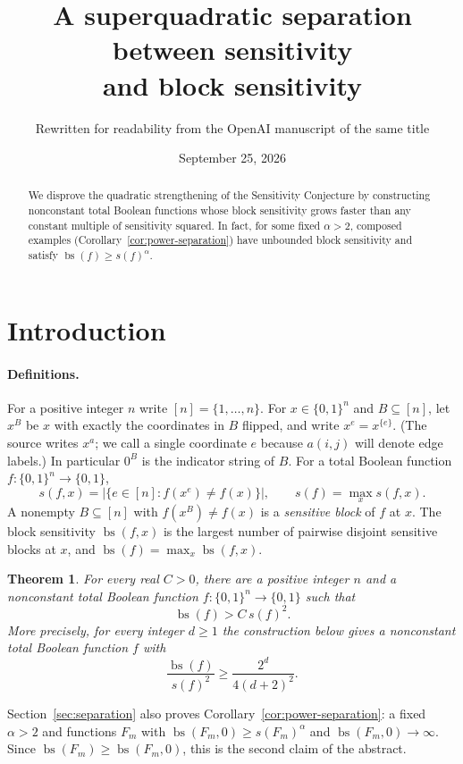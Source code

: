 \documentclass[11pt]{article}
\title{A superquadratic separation between sensitivity\\and block sensitivity}
\author{Rewritten for readability from the OpenAI manuscript of the same title}
\date{September 25, 2026}
\newcommand{\bs}{\operatorname{bs}}
\newtheorem{theorem}{Theorem}[section]
\theoremstyle{definition}
\theoremstyle{remark}
\begin{document}
\maketitle
\begin{abstract}
We disprove the quadratic strengthening of the Sensitivity Conjecture by
constructing nonconstant total Boolean functions whose block sensitivity grows
faster than any constant multiple of sensitivity squared. In fact, for some
fixed \(\alpha>2\), composed examples (Corollary~\ref{cor:power-separation})
have unbounded block sensitivity and satisfy \(\bs(f)\ge s(f)^\alpha\).
\end{abstract}

\section{Introduction}
\label{sec:introduction}

\paragraph{Definitions.}
For a positive integer $n$ write $[n]=\{1,\ldots,n\}$. For $x\in\{0,1\}^n$ and
$B\subseteq[n]$, let $x^B$ be $x$ with exactly the coordinates in $B$ flipped,
and write $x^e=x^{\{e\}}$. (The source writes $x^a$; we call a single
coordinate $e$ because $a(i,j)$ will denote edge labels.) In particular $0^B$
is the indicator string of $B$. For a total Boolean function
$f:\{0,1\}^n\to\{0,1\}$,
\[
 s(f,x)=\bigl|\{e\in[n]:f(x^e)\ne f(x)\}\bigr|,\qquad s(f)=\max_x s(f,x).
\]
A nonempty $B\subseteq[n]$ with $f(x^B)\ne f(x)$ is a \emph{sensitive block}
of $f$ at $x$. The block sensitivity $\bs(f,x)$ is the largest number of
pairwise disjoint sensitive blocks at $x$, and $\bs(f)=\max_x\bs(f,x)$.

\begin{theorem}\label{thm:main}
For every real \(C>0\), there are a positive integer \(n\) and a
nonconstant total Boolean function \(f:\{0,1\}^n\to\{0,1\}\) such that
\[
 \bs(f)>C\,s(f)^2.
\]
More precisely, for every integer \(d\ge1\) the construction below gives
a nonconstant total Boolean function \(f\) with
\[
 \frac{\bs(f)}{s(f)^2}\ge \frac{2^d}{4(d+2)^2}.
\]
\end{theorem}

Section~\ref{sec:separation} also proves
Corollary~\ref{cor:power-separation}: a fixed $\alpha>2$ and functions $F_m$
with $\bs(F_m,0)\ge s(F_m)^\alpha$ and $\bs(F_m,0)\to\infty$. Since
$\bs(F_m)\ge\bs(F_m,0)$, this is the second claim of the abstract.
\end{document}
